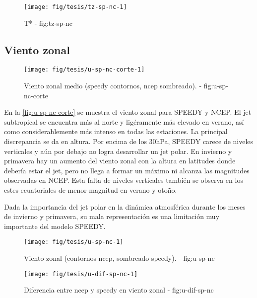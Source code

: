 \documentclass[spanish,a4paper]{book}
\begin{document}
\begin{figure*}
\texttt{[image: fig/tesis/tz-sp-nc-1]} \caption{T* - fig:tz-sp-nc}\label{fig:tz-sp-nc}
\end{figure*}

\subsection{Viento zonal}\label{viento-zonal-1}

\begin{figure}

{\centering \texttt{[image: fig/tesis/u-sp-nc-corte-1]} 

}

\caption{Viento zonal medio (speedy contornos, ncep sombreado). - fig:u-sp-nc-corte}\label{fig:u-sp-nc-corte}
\end{figure}

En la \autoref{fig:u-sp-nc-corte} se muestra el viento zonal para SPEEDY
y NCEP. El jet subtropical se encuentra más al norte y ligéramente más
elevado en verano, así como considerablemente más intenso en todas las
estaciones. La principal discrepancia se da en altura. Por encima de los
30hPa, SPEEDY carece de niveles verticales y aún por debajo no logra
desarrollar un jet polar. En invierno y primavera hay un aumento del
viento zonal con la altura en latitudes donde debería estar el jet, pero
no llega a formar un máximo ni alcanza las magnitudes observadas en
NCEP. Esta falta de niveles verticales también se observa en los estes
ecuatoriales de menor magnitud en verano y otoño.

Dada la importancia del jet polar en la dinámica atmosférica durante los
meses de invierno y primavera, su mala representación es una
limitación muy importante del modelo SPEEDY.

\begin{landscape}\begin{figure}

{\centering \texttt{[image: fig/tesis/u-sp-nc-1]} 

}

\caption{Viento zonal (contornos ncep, sombreado speedy). - fig:u-sp-nc}\label{fig:u-sp-nc}
\end{figure}
\end{landscape}

\begin{figure*}
\texttt{[image: fig/tesis/u-dif-sp-nc-1]} \caption{Diferencia entre ncep y speedy en viento zonal - fig:u-dif-sp-nc}\label{fig:u-dif-sp-nc}
\end{figure*}
\end{document}
